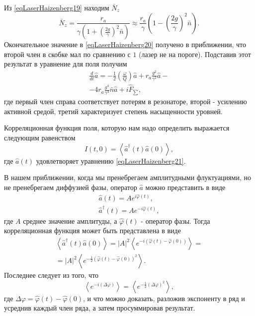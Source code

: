 Из \eqref{eqLaserHaizenberg19} находим $\bar{N}_z$
\begin{equation}
\bar{N}_z = \frac{r_a}{\gamma\left(1+ \left(\frac{2
    g}{\gamma}\right)^2 \bar{n}\right)} 
\approx
\frac{r_a}{\gamma}
\left(1 - \left(\frac{2 g}{\gamma}\right)^2
\bar{n}\right).
\label{eqLaserHaizenberg20}
\end{equation}
Окончательное значение в \eqref{eqLaserHaizenberg20} получено в
приближении, что второй член в скобке мал по сравнению с $1$ (лазер не
на пороге). Подставив этот результат в уравнение для поля получим
\begin{eqnarray}
\frac{d}{dt}\hat{a} = -\frac{1}{2}\left(\frac{\omega}{Q}\right)\hat{a}
+ r_a \frac{g^2}{\gamma^2}\hat{a} - 
\nonumber \\
- 4 r_a\frac{g^4}{\gamma^4} \bar{n}\hat{a} + i \hat{F}_{\sum},
\label{eqLaserHaizenberg21}
\end{eqnarray}
где первый член справа соответствует потерям в резонаторе, второй -
усилению активной средой, третий характеризует степень насыщенности
уровней. 

Корреляционная функция поля, которую нам надо определить выражается
следующим равенством
\begin{equation}
I\left(t, 0\right) = \left<\hat{a}^{\dag}\left(t\right)\hat{a}\left(0\right)\right>,
\nonumber
\end{equation}
где $\hat{a}\left(t\right)$ удовлетворяет уравнению
\eqref{eqLaserHaizenberg21}. 

В нашем приближении, когда мы пренебрегаем амплитудными флуктуациями,
но не пренебрегаем диффузией фазы, оператор $\hat{a}$ можно
представить в виде
\begin{eqnarray}
\hat{a}\left(t\right) = A e^{i\hat{\varphi}\left(t\right)},
\nonumber \\
\hat{a}^{\dag}\left(t\right) = A e^{-i\hat{\varphi}\left(t\right)},
\label{eqLaserHaizenbergAConstPhi}
\end{eqnarray}
где $A$ среднее значение амплитуды, а $\hat{\varphi}\left(t\right)$ -
оператор фазы. Тогда корреляционная функция может быть представлена в
виде 
\begin{eqnarray}
\left<\hat{a}^{\dag}\left(t\right)\hat{a}\left(0\right)\right> =
\left|A\right|^2 \left<e^{-i\left(\hat{\varphi}\left(t\right) -
  \hat{\varphi}\left(0\right)\right)}\right> = 
\nonumber \\
= 
\left|A\right|^2 \left<e^{-\frac{1}{2}\left(\hat{\varphi}\left(t\right) -
  \hat{\varphi}\left(0\right)\right)^2}\right>.
\label{eqLaserHaizenbergTaskMiddle}
\end{eqnarray}
Последнее следует из того, что 
\begin{equation}
\left<e^{-i \left(\Delta \varphi\right)}\right> = 
\left<e^{-\frac{1}{2} \left(\Delta \varphi\right)^2}\right>,
\nonumber
\end{equation}
где $\Delta \varphi = \hat{\varphi}\left(t\right) -
\hat{\varphi}\left(0\right)$, и что можно доказать, разложив
экспоненту в ряд и усреднив каждый член ряда, а затем просуммировав
результат.

